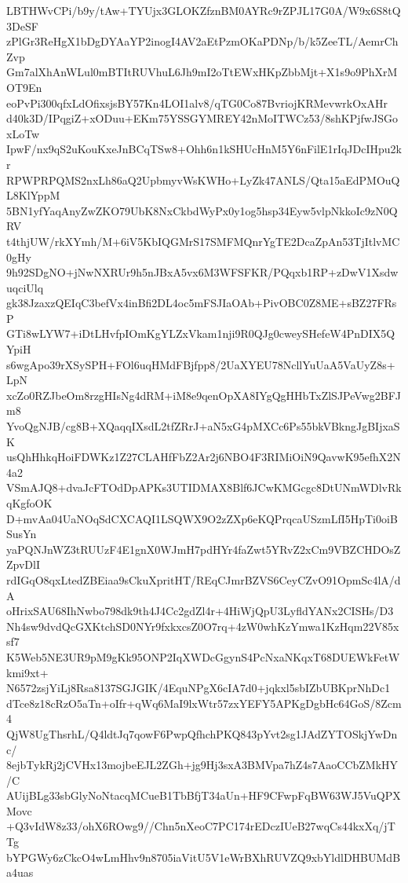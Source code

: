 LBTHWvCPi/b9y/tAw+TYUjx3GLOKZfznBM0AYRc9rZPJL17G0A/W9x6S8tQ3DeSF
zPlGr3ReHgX1bDgDYAaYP2inogI4AV2aEtPzmOKaPDNp/b/k5ZeeTL/AemrChZvp
Gm7alXhAnWLul0mBTItRUVhuL6Jh9mI2oTtEWxHKpZbbMjt+X1s9o9PhXrMOT9En
eoPvPi300qfxLdOfixsjsBY57Kn4LOI1alv8/qTG0Co87BvriojKRMevwrkOxAHr
d40k3D/IPqgiZ+xODuu+EKm75YSSGYMREY42nMoITWCz53/8shKPjfwJSGoxLoTw
IpwF/nx9qS2uKouKxeJnBCqTSw8+Ohh6n1kSHUcHnM5Y6nFilE1rIqJDcIHpu2kr
RPWPRPQMS2nxLh86aQ2UpbmyvWsKWHo+LyZk47ANLS/Qta15aEdPMOuQL8KlYppM
5BN1yfYaqAnyZwZKO79UbK8NxCkbdWyPx0y1og5hsp34Eyw5vlpNkkoIc9zN0QRV
t4thjUW/rkXYmh/M+6iV5KbIQGMrS17SMFMQnrYgTE2DcaZpAn53TjItlvMC0gHy
9h92SDgNO+jNwNXRUr9h5nJBxA5vx6M3WFSFKR/PQqxb1RP+zDwV1XsdwuqciUlq
gk38JzaxzQEIqC3befVx4inBfi2DL4oc5mFSJIaOAb+PivOBC0Z8ME+sBZ27FRsP
GTi8wLYW7+iDtLHvfpIOmKgYLZxVkam1nji9R0QJg0cweySHefeW4PnDIX5QYpiH
s6wgApo39rXSySPH+FOl6uqHMdFBjfpp8/2UaXYEU78NcllYuUaA5VaUyZ8s+LpN
xcZo0RZJbeOm8rzgHIsNg4dRM+iM8e9qenOpXA8IYgQgHHbTxZlSJPeVwg2BFJm8
YvoQgNJB/cg8B+XQaqqIXsdL2tfZRrJ+aN5xG4pMXCc6Ps55bkVBkngJgBIjxaSK
usQhHhkqHoiFDWKz1Z27CLAHfFbZ2Ar2j6NBO4F3RIMiOiN9QavwK95efhX2N4a2
VSmAJQ8+dvaJcFTOdDpAPKs3UTIDMAX8Blf6JCwKMGcgc8DtUNmWDlvRkqKgfoOK
D+mvAa04UaNOqSdCXCAQI1LSQWX9O2zZXp6eKQPrqcaUSzmLfI5HpTi0oiBSusYn
yaPQNJnWZ3tRUUzF4E1gnX0WJmH7pdHYr4faZwt5YRvZ2xCm9VBZCHDOsZZpvDlI
rdIGqO8qxLtedZBEiaa9sCkuXpritHT/REqCJmrBZVS6CeyCZvO91OpmSc4lA/dA
oHrixSAU68IhNwbo798dk9th4J4Cc2gdZl4r+4HiWjQpU3LyfldYANx2CISHs/D3
Nh4sw9dvdQcGXKtchSD0NYr9fxkxcsZ0O7rq+4zW0whKzYmwa1KzHqm22V85xsf7
K5Web5NE3UR9pM9gKk95ONP2IqXWDcGgynS4PcNxaNKqxT68DUEWkFetWkmi9xt+
N6572zsjYiLj8Rsa8137SGJGIK/4EquNPgX6cIA7d0+jqkxl5sbIZbUBKprNhDc1
dTce8z18cRzO5aTn+oIfr+qWq6MaI9lxWtr57zxYEFY5APKgDgbHc64GoS/8Zcm4
QjW8UgThsrhL/Q4ldtJq7qowF6PwpQfhchPKQ843pYvt2sg1JAdZYTOSkjYwDnc/
8ejbTykRj2jCVHx13mojbeEJL2ZGh+jg9Hj3sxA3BMVpa7hZ4s7AaoCCbZMkHY/C
AUijBLg33sbGlyNoNtacqMCueB1TbBfjT34aUn+HF9CFwpFqBW63WJ5VuQPXMovc
+Q3vIdW8z33/ohX6ROwg9//Chn5nXeoC7PC174rEDczIUeB27wqCs44kxXq/jTTg
bYPGWy6zCkcO4wLmHhv9n8705iaVitU5V1eWrBXhRUVZQ9xbYldlDHBUMdBa4uas
